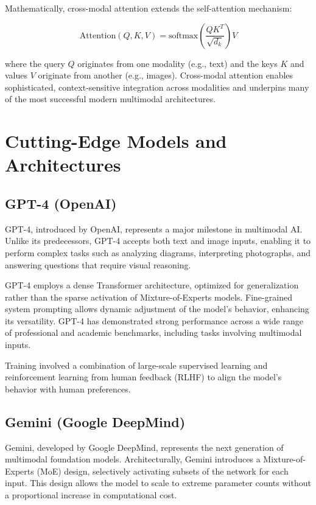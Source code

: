 \documentclass[openany]{book}
\begin{document}
Mathematically, cross-modal attention extends the self-attention mechanism:

\[
\text{Attention}(Q, K, V) = \text{softmax}\left( \frac{QK^T}{\sqrt{d_k}} \right)V
\]

where the query \(Q\) originates from one modality (e.g., text) and the keys \(K\) 
and values \(V\) originate from another (e.g., images). Cross-modal attention 
enables sophisticated, context-sensitive integration across modalities and 
underpins many of the most successful modern multimodal architectures.

\section{Cutting-Edge Models and Architectures}

\subsection{GPT-4 (OpenAI)}

GPT-4, introduced by OpenAI, represents a major milestone in multimodal AI. Unlike 
its predecessors, GPT-4 accepts both text and image inputs, enabling it to perform 
complex tasks such as analyzing diagrams, interpreting photographs, and answering 
questions that require visual reasoning.

GPT-4 employs a dense Transformer architecture, optimized for generalization 
rather than the sparse activation of Mixture-of-Experts models. Fine-grained 
system prompting allows dynamic adjustment of the model’s behavior, enhancing its 
versatility. GPT-4 has demonstrated strong performance across a wide range of 
professional and academic benchmarks, including tasks involving multimodal inputs.

Training involved a combination of large-scale supervised learning and 
reinforcement learning from human feedback (RLHF) to align the model’s behavior 
with human preferences.

\subsection{Gemini (Google DeepMind)}

Gemini, developed by Google DeepMind, represents the next generation of multimodal 
foundation models. Architecturally, Gemini introduces a Mixture-of-Experts (MoE) 
design, selectively activating subsets of the network for each input. This design 
allows the model to scale to extreme parameter counts without a proportional 
increase in computational cost.
\end{document}
